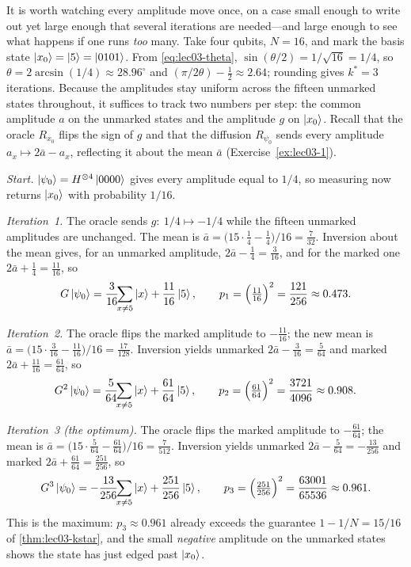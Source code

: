 \begin{example}[A fully worked run: $N=16$, marked item $x_0=5$]
\label{exa:lec03-n8}
It is worth watching every amplitude move once, on a case small enough to write
out yet large enough that several iterations are needed---and large enough to see
what happens if one runs \emph{too} many. Take four qubits, $N=16$, and mark the
basis state $\ket{x_0}=\ket{5}=\ket{0101}$. From \eqref{eq:lec03-theta},
$\sin(\theta/2)=1/\sqrt{16}=1/4$, so $\theta=2\arcsin(1/4)\approx28.96^{\circ}$ and
$(\pi/2\theta)-\tfrac12\approx2.64$; rounding gives $k^{\ast}=3$ iterations. Because
the amplitudes stay uniform across the fifteen unmarked states throughout, it
suffices to track two numbers per step: the common amplitude $a$ on the unmarked
states and the amplitude $g$ on $\ket{x_0}$. Recall that the oracle $R_{x_0}$ flips
the sign of $g$ and that the diffusion $R_{\psi_0}$ sends every amplitude
$a_x\mapsto 2\bar a-a_x$, reflecting it about the mean $\bar a$
(Exercise~\ref{ex:lec03-1}).

\emph{Start.} $\ket{\psi_0}=H^{\otimes4}\ket{0000}$ gives every amplitude equal to
$1/4$, so measuring now returns $\ket{x_0}$ with probability $1/16$.

\emph{Iteration~1.} The oracle sends $g\colon\ 1/4\mapsto-1/4$ while the fifteen
unmarked amplitudes are unchanged. The mean is
$\bar a=\bigl(15\cdot\tfrac14-\tfrac14\bigr)/16=\tfrac{7}{32}$. Inversion about the
mean gives, for an unmarked amplitude, $2\bar a-\tfrac14=\tfrac{3}{16}$, and for the
marked one $2\bar a+\tfrac14=\tfrac{11}{16}$, so
\[
  G\ket{\psi_0}=\frac{3}{16}\!\!\sum_{x\neq 5}\ket{x}+\frac{11}{16}\ket{5},
  \qquad
  p_1=\Bigl(\tfrac{11}{16}\Bigr)^{2}=\frac{121}{256}\approx0.473.
\]

\emph{Iteration~2.} The oracle flips the marked amplitude to $-\tfrac{11}{16}$; the
new mean is $\bar a=\bigl(15\cdot\tfrac{3}{16}-\tfrac{11}{16}\bigr)/16
=\tfrac{17}{128}$. Inversion yields unmarked $2\bar a-\tfrac{3}{16}=\tfrac{5}{64}$
and marked $2\bar a+\tfrac{11}{16}=\tfrac{61}{64}$, so
\[
  G^{2}\ket{\psi_0}=\frac{5}{64}\!\!\sum_{x\neq5}\ket{x}+\frac{61}{64}\ket{5},
  \qquad
  p_2=\Bigl(\tfrac{61}{64}\Bigr)^{2}=\frac{3721}{4096}\approx0.908.
\]

\emph{Iteration~3 (the optimum).} The oracle flips the marked amplitude to
$-\tfrac{61}{64}$; the mean is
$\bar a=\bigl(15\cdot\tfrac{5}{64}-\tfrac{61}{64}\bigr)/16=\tfrac{7}{512}$.
Inversion yields unmarked $2\bar a-\tfrac{5}{64}=-\tfrac{13}{256}$ and marked
$2\bar a+\tfrac{61}{64}=\tfrac{251}{256}$, so
\[
  G^{3}\ket{\psi_0}=-\frac{13}{256}\!\!\sum_{x\neq5}\ket{x}+\frac{251}{256}\ket{5},
  \qquad
  p_3=\Bigl(\tfrac{251}{256}\Bigr)^{2}=\frac{63001}{65536}\approx0.961.
\]
This is the maximum: $p_3\approx0.961$ already exceeds the guarantee $1-1/N=15/16$
of \cref{thm:lec03-kstar}, and the small \emph{negative} amplitude on the unmarked
states shows the state has just edged past $\ket{x_0}$.


\end{example}
